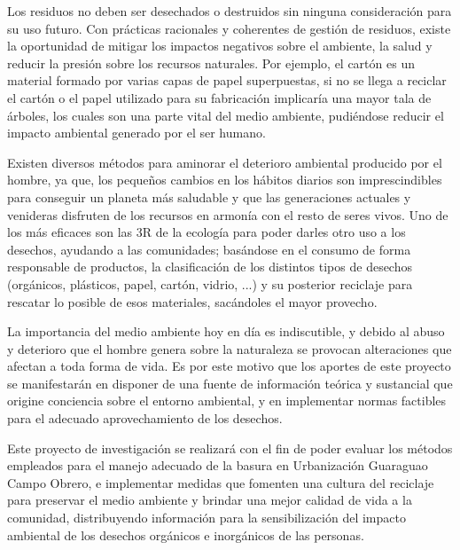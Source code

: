 Los residuos no deben ser desechados o destruidos sin ninguna consideración para su uso futuro. Con prácticas racionales y coherentes de gestión de residuos, existe la oportunidad de mitigar los impactos negativos sobre el ambiente, la salud y reducir la presión sobre los recursos naturales. Por ejemplo, el cartón es un material formado por varias capas de papel superpuestas, si no se llega a reciclar el cartón o el papel utilizado para su fabricación implicaría una mayor tala de árboles, los cuales son una parte vital del medio ambiente, pudiéndose reducir el impacto ambiental generado por el ser humano.

Existen diversos métodos para aminorar el deterioro ambiental producido por el hombre, ya que, los pequeños cambios en los hábitos diarios son imprescindibles para conseguir un planeta más saludable y que las generaciones actuales y venideras disfruten de los recursos en armonía con el resto de seres vivos. Uno de los más eficaces son las 3R de la ecología para poder darles otro uso a los desechos, ayudando a las comunidades; basándose en el consumo de forma responsable de productos, la clasificación de los distintos tipos de desechos (orgánicos, plásticos, papel, cartón, vidrio, ...) y su posterior reciclaje para rescatar lo posible de esos materiales, sacándoles el mayor provecho.

 La importancia del medio ambiente hoy en día es indiscutible, y debido al abuso y deterioro que el hombre genera sobre la naturaleza se provocan alteraciones que afectan a toda forma de vida. Es por este motivo que los aportes de este proyecto se manifestarán en disponer de una fuente de información teórica y sustancial que origine conciencia sobre el entorno ambiental, y en implementar normas factibles para el adecuado aprovechamiento de los desechos.

Este proyecto de investigación se realizará con el fin de poder evaluar los métodos empleados para el manejo adecuado de la basura en Urbanización Guaraguao Campo Obrero, e implementar medidas que fomenten una cultura del reciclaje para preservar el medio ambiente y brindar una mejor calidad de vida a la comunidad, distribuyendo información para la sensibilización del impacto ambiental de los desechos orgánicos e inorgánicos de las personas.

\newpage